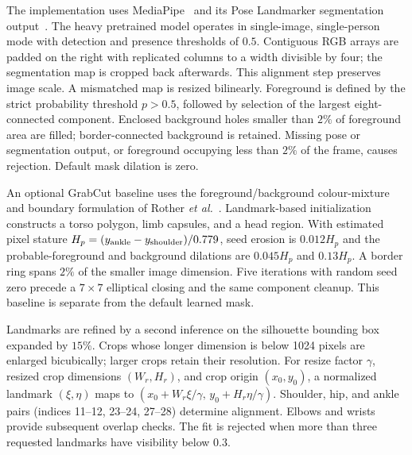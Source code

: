 \documentclass[11pt,a4paper]{article}
\begin{document}
The implementation uses MediaPipe~\cite{lugaresi2019mediapipe} and its Pose Landmarker segmentation output~\cite{mediapipeguide}. The heavy pretrained model operates in single-image, single-person mode with detection and presence thresholds of $0.5$. Contiguous RGB arrays are padded on the right with replicated columns to a width divisible by four; the segmentation map is cropped back afterwards. This alignment step preserves image scale. A mismatched map is resized bilinearly. Foreground is defined by the strict probability threshold $p>0.5$, followed by selection of the largest eight-connected component. Enclosed background holes smaller than $2\%$ of foreground area are filled; border-connected background is retained. Missing pose or segmentation output, or foreground occupying less than $2\%$ of the frame, causes rejection. Default mask dilation is zero.

An optional GrabCut baseline uses the foreground/background colour-mixture and boundary formulation of Rother \emph{et al.}~\cite{rother2004grabcut}. Landmark-based initialization constructs a torso polygon, limb capsules, and a head region. With estimated pixel stature $H_p=(y_{\rm ankle}-y_{\rm shoulder})/0.779$, seed erosion is $0.012H_p$ and the probable-foreground and background dilations are $0.045H_p$ and $0.13H_p$. A border ring spans $2\%$ of the smaller image dimension. Five iterations with random seed zero precede a $7\times7$ elliptical closing and the same component cleanup. This baseline is separate from the default learned mask.

Landmarks are refined by a second inference on the silhouette bounding box expanded by $15\%$. Crops whose longer dimension is below 1024 pixels are enlarged bicubically; larger crops retain their resolution. For resize factor $\gamma$, resized crop dimensions $(W_r,H_r)$, and crop origin $(x_0,y_0)$, a normalized landmark $(\xi,\eta)$ maps to $(x_0+W_r\xi/\gamma,\,y_0+H_r\eta/\gamma)$. Shoulder, hip, and ankle pairs (indices 11--12, 23--24, 27--28) determine alignment. Elbows and wrists provide subsequent overlap checks. The fit is rejected when more than three requested landmarks have visibility below $0.3$.
\end{document}
